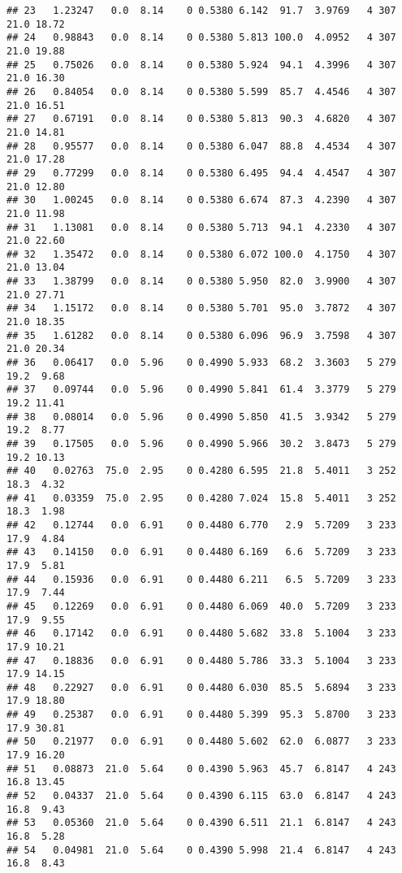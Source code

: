 \documentclass[
]{article}
\begin{document}
\begin{verbatim}
## 23   1.23247   0.0  8.14    0 0.5380 6.142  91.7  3.9769   4 307    21.0 18.72
## 24   0.98843   0.0  8.14    0 0.5380 5.813 100.0  4.0952   4 307    21.0 19.88
## 25   0.75026   0.0  8.14    0 0.5380 5.924  94.1  4.3996   4 307    21.0 16.30
## 26   0.84054   0.0  8.14    0 0.5380 5.599  85.7  4.4546   4 307    21.0 16.51
## 27   0.67191   0.0  8.14    0 0.5380 5.813  90.3  4.6820   4 307    21.0 14.81
## 28   0.95577   0.0  8.14    0 0.5380 6.047  88.8  4.4534   4 307    21.0 17.28
## 29   0.77299   0.0  8.14    0 0.5380 6.495  94.4  4.4547   4 307    21.0 12.80
## 30   1.00245   0.0  8.14    0 0.5380 6.674  87.3  4.2390   4 307    21.0 11.98
## 31   1.13081   0.0  8.14    0 0.5380 5.713  94.1  4.2330   4 307    21.0 22.60
## 32   1.35472   0.0  8.14    0 0.5380 6.072 100.0  4.1750   4 307    21.0 13.04
## 33   1.38799   0.0  8.14    0 0.5380 5.950  82.0  3.9900   4 307    21.0 27.71
## 34   1.15172   0.0  8.14    0 0.5380 5.701  95.0  3.7872   4 307    21.0 18.35
## 35   1.61282   0.0  8.14    0 0.5380 6.096  96.9  3.7598   4 307    21.0 20.34
## 36   0.06417   0.0  5.96    0 0.4990 5.933  68.2  3.3603   5 279    19.2  9.68
## 37   0.09744   0.0  5.96    0 0.4990 5.841  61.4  3.3779   5 279    19.2 11.41
## 38   0.08014   0.0  5.96    0 0.4990 5.850  41.5  3.9342   5 279    19.2  8.77
## 39   0.17505   0.0  5.96    0 0.4990 5.966  30.2  3.8473   5 279    19.2 10.13
## 40   0.02763  75.0  2.95    0 0.4280 6.595  21.8  5.4011   3 252    18.3  4.32
## 41   0.03359  75.0  2.95    0 0.4280 7.024  15.8  5.4011   3 252    18.3  1.98
## 42   0.12744   0.0  6.91    0 0.4480 6.770   2.9  5.7209   3 233    17.9  4.84
## 43   0.14150   0.0  6.91    0 0.4480 6.169   6.6  5.7209   3 233    17.9  5.81
## 44   0.15936   0.0  6.91    0 0.4480 6.211   6.5  5.7209   3 233    17.9  7.44
## 45   0.12269   0.0  6.91    0 0.4480 6.069  40.0  5.7209   3 233    17.9  9.55
## 46   0.17142   0.0  6.91    0 0.4480 5.682  33.8  5.1004   3 233    17.9 10.21
## 47   0.18836   0.0  6.91    0 0.4480 5.786  33.3  5.1004   3 233    17.9 14.15
## 48   0.22927   0.0  6.91    0 0.4480 6.030  85.5  5.6894   3 233    17.9 18.80
## 49   0.25387   0.0  6.91    0 0.4480 5.399  95.3  5.8700   3 233    17.9 30.81
## 50   0.21977   0.0  6.91    0 0.4480 5.602  62.0  6.0877   3 233    17.9 16.20
## 51   0.08873  21.0  5.64    0 0.4390 5.963  45.7  6.8147   4 243    16.8 13.45
## 52   0.04337  21.0  5.64    0 0.4390 6.115  63.0  6.8147   4 243    16.8  9.43
## 53   0.05360  21.0  5.64    0 0.4390 6.511  21.1  6.8147   4 243    16.8  5.28
## 54   0.04981  21.0  5.64    0 0.4390 5.998  21.4  6.8147   4 243    16.8  8.43

\end{verbatim}
\end{document}
